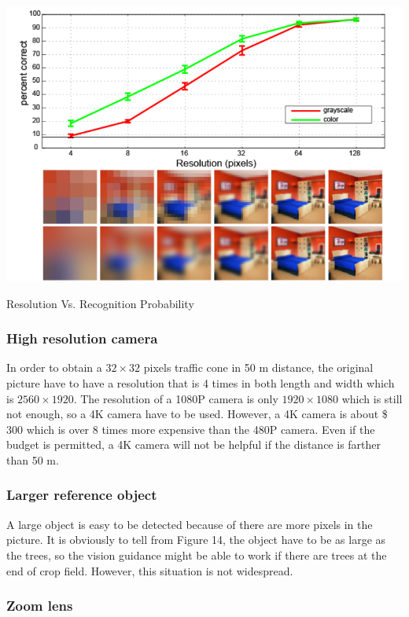 \documentclass[letterpaper,12pt,oneside]{book}
\begin{document}
		\begin{table}[ht!]
			\begin{center}
				\includegraphics[scale = 0.6]{pixel.png}
				\caption{Resolution Vs. Recognition Probability}
			\end{center}
		\end{table}
		
		\subsubsection{High resolution camera}
			
		In order to obtain a $32\times32$ pixels traffic cone in 50 m distance, the original picture have to have a resolution that is 4 times in both length and width which is $2560\times1920$. The resolution of a 1080P camera is only $1920\times1080$ which is still not enough, so a 4K camera have to be used. However, a 4K camera is about \$ 300 which is over 8 times more expensive than the 480P camera. Even if the budget is permitted, a 4K camera will not be helpful if the distance is farther than 50 m.
		\subsubsection{Larger reference object}
			
		A large object is easy to be detected because of there are more pixels in the picture. It is obviously to tell from Figure 14, the object have to be as large as the trees, so the vision guidance might be able to work if there are trees at the end of crop field. However, this situation is not widespread.
			
		\subsubsection{Zoom lens}
			
\end{document}
